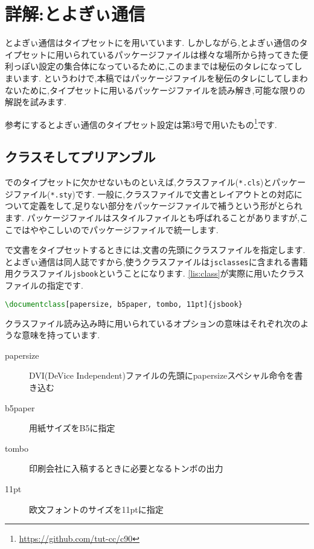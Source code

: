 \newcommand*{\reflisting}[1]{\lstlistingname\ref{#1}}
\renewcommand*\descriptionlabel[1]{\normalfont\headfont #1 :\hfil}

\chapter{詳解:とよぎぃ通信}

とよぎぃ通信はタイプセットに{\pLaTeX}を用いています.
しかしながら,とよぎぃ通信のタイプセットに用いられているパッケージファイルは様々な場所から持ってきた便利っぽい設定の集合体になっているために,このままでは秘伝のタレになってしまいます.
というわけで,本稿ではパッケージファイルを秘伝のタレにしてしまわないために,タイプセットに用いるパッケージファイルを読み解き,可能な限りの解説を試みます.

参考にするとよぎぃ通信のタイプセット設定は第3号で用いたもの\footnote{\url{https://github.com/tut-cc/c90}}です.

\section{クラスそしてプリアンブル}

{\pLaTeX}でのタイプセットに欠かせないものといえば,クラスファイル(\texttt{*.cls})とパッケージファイル(\texttt{*.sty})です.
一般に,クラスファイルで文書とレイアウトとの対応について定義をして,足りない部分をパッケージファイルで補うという形がとられます.
パッケージファイルはスタイルファイルとも呼ばれることがありますが,ここではややこしいのでパッケージファイルで統一します.

{\pLaTeX}で文書をタイプセットするときには,文書の先頭にクラスファイルを指定します.
とよぎぃ通信は同人誌ですから,使うクラスファイルは\texttt{jsclasses}に含まれる書籍用クラスファイル\texttt{jsbook}ということになります.
\reflisting{lis:class}が実際に用いたクラスファイルの指定です.
\begin{lstlisting}[caption=クラスファイルの指定,label=lis:class,language=tex]
\documentclass[papersize, b5paper, tombo, 11pt]{jsbook}
\end{lstlisting}
クラスファイル読み込み時に用いられているオプションの意味はそれぞれ次のような意味を持っています.
\begin{description}
	\item[papersize] DVI(DeVice Independent)ファイルの先頭にpapersizeスペシャル命令を書き込む
	\item[b5paper] 用紙サイズをB5に指定
	\item[tombo] 印刷会社に入稿するときに必要となるトンボの出力
	\item[11pt] 欧文フォントのサイズを11ptに指定
\end{description}

